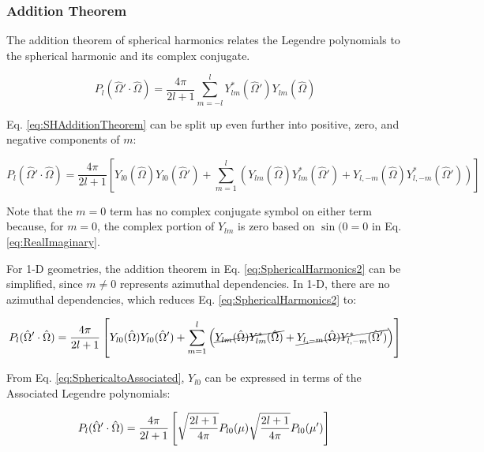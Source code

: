 \documentclass[10pt]{article}
\begin{document}
\begin{flushleft}
\subsubsection{Addition Theorem}
The addition theorem of spherical harmonics relates the Legendre polynomials to the spherical harmonic and its complex conjugate. 

\begin{equation}
\label{eq:SHAdditionTheorem}
P_l(\hat{\Omega}'\cdot\hat{\Omega}) = \frac{4\pi}{2l+1} \sum_{m=-l}^{l} Y_{lm}^{*} (\hat{\Omega}') Y_{lm}(\hat{\Omega})
\end{equation}

Eq. \eqref{eq:SHAdditionTheorem} can be split up even further into positive, zero, and negative components of \(m\):

\begin{equation}
\label{eq:SphericalHarmonics2}
P_l(\hat{\Omega}'\cdot\hat{\Omega})=\frac{4\pi}{2l+1}\left\lbrack Y_{l0}(\hat{\Omega})Y_{l0}(\hat{\Omega}')+\sum_{m=1}^{l}\left(Y_{lm}(\hat{\Omega})Y_{lm}^*(\hat{\Omega}')+Y_{l,-m}(\hat{\Omega})Y_{l,-m}^*(\hat{\Omega}')\right)\right\rbrack
\end{equation}

Note that the \(m=0\) term has no complex conjugate symbol on either term because, for \(m=0\), the complex portion of \(Y_{lm}\) is zero based on \(\sin{(0}=0\) in Eq. \eqref{eq:RealImaginary}. 



\begin{tcolorbox}[breakable]
For 1-D geometries, the addition theorem in Eq. \eqref{eq:SphericalHarmonics2} can be simplified, since \(m\neq0\) represents azimuthal dependencies. In 1-D, there are no azimuthal dependencies, which reduces Eq. \eqref{eq:SphericalHarmonics2} to:

\begin{equation}
\label{eq:SphericalHarmonics3}
P_l(\hat{\Omega}'\cdot\hat{\Omega})=\frac{4\pi}{2l+1}\left\lbrack Y_{l0}(\hat{\Omega})Y_{l0}(\hat{\Omega}')+\sum_{m=1}^{l}\left(\cancel{Y_{lm}(\hat{\Omega})Y_{lm}^*(\hat{\Omega})}+\cancel{Y_{l,-m}(\hat{\Omega})Y_{l,-m}^*(\hat{\Omega}')}\right)\right\rbrack
\end{equation}

From Eq. \eqref{eq:SphericaltoAssociated}, \(Y_{l0}\) can be expressed in terms of the Associated Legendre polynomials:

\begin{equation}
\label{eq:SphericalHarmonics4}
P_l(\hat{\Omega}'\cdot\hat{\Omega})=\frac{4\pi}{2l+1}\left\lbrack \sqrt{\frac{2l+1}{4\pi}}P_{l0}(\mu)\sqrt{\frac{2l+1}{4\pi}}P_{l0}(\mu')\right\rbrack\\
\end{equation}


\end{tcolorbox}
\end{flushleft}
\end{document}
